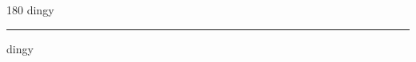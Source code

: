 
\begin{frame}
\begin{center}
\begin{turn}{180}
{\fontsize{2.5cm}{1em}\selectfont dingy}
\end{turn}
\vspace{1em}\par  
\hrule
\vspace{1em}\par  
{\fontsize{2.5cm}{1em}\selectfont dingy}
\end{center}
\end{frame}
